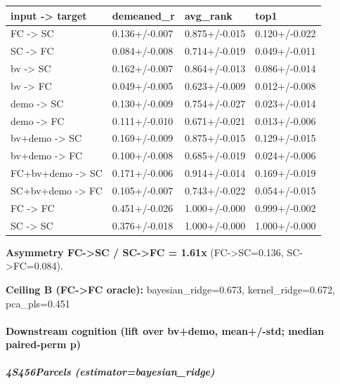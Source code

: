 {\def\LTcaptype{none} %
\begin{longtable}[]{@{}llll@{}}
\toprule\noalign{}
input -\textgreater{} target & demeaned\_r & avg\_rank & top1 \\
\midrule\noalign{}
\endhead
\bottomrule\noalign{}
\endlastfoot
FC -\textgreater{} SC & 0.136+/-0.007 & 0.875+/-0.015 & 0.120+/-0.022 \\
SC -\textgreater{} FC & 0.084+/-0.008 & 0.714+/-0.019 & 0.049+/-0.011 \\
bv -\textgreater{} SC & 0.162+/-0.007 & 0.864+/-0.013 & 0.086+/-0.014 \\
bv -\textgreater{} FC & 0.049+/-0.005 & 0.623+/-0.009 & 0.012+/-0.008 \\
demo -\textgreater{} SC & 0.130+/-0.009 & 0.754+/-0.027 & 0.023+/-0.014 \\
demo -\textgreater{} FC & 0.111+/-0.010 & 0.671+/-0.021 & 0.013+/-0.006 \\
bv+demo -\textgreater{} SC & 0.169+/-0.009 & 0.875+/-0.015 & 0.129+/-0.015 \\
bv+demo -\textgreater{} FC & 0.100+/-0.008 & 0.685+/-0.019 & 0.024+/-0.006 \\
FC+bv+demo -\textgreater{} SC & 0.171+/-0.006 & 0.914+/-0.014 & 0.169+/-0.019 \\
SC+bv+demo -\textgreater{} FC & 0.105+/-0.007 & 0.743+/-0.022 & 0.054+/-0.015 \\
FC -\textgreater{} FC & 0.451+/-0.026 & 1.000+/-0.000 & 0.999+/-0.002 \\
SC -\textgreater{} SC & 0.376+/-0.018 & 1.000+/-0.000 & 1.000+/-0.000 \\
\end{longtable}
}

\textbf{Asymmetry FC-\textgreater SC / SC-\textgreater FC = 1.61x} (FC-\textgreater SC=0.136, SC-\textgreater FC=0.084).

\textbf{Ceiling B (FC-\textgreater FC oracle):} bayesian\_ridge=0.673, kernel\_ridge=0.672, pca\_pls=0.451

\paragraph{Downstream cognition (lift over bv+demo, mean+/-std; median paired-perm p)}\label{downstream-cognition-lift-over-bvdemo-mean-std-median-paired-perm-p}

\subparagraph{4S456Parcels (estimator=bayesian\_ridge)}\label{4s456parcels-estimatorbayesian_ridge}

